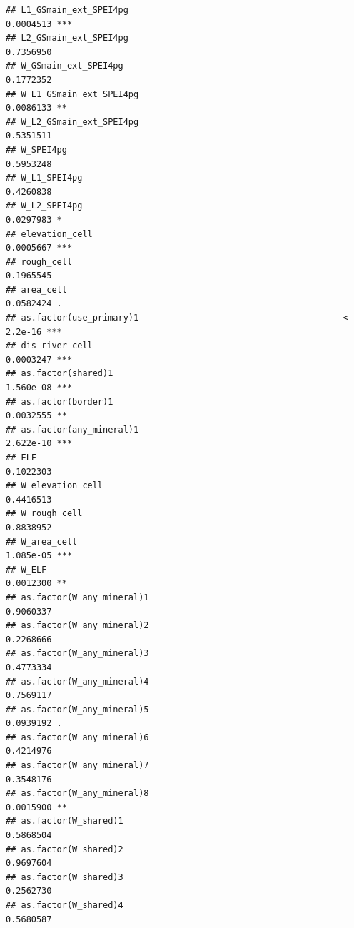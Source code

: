 \documentclass[
  a4paper,
]{article}
\begin{document}
\begin{verbatim}
## L1_GSmain_ext_SPEI4pg                                          0.0004513 ***
## L2_GSmain_ext_SPEI4pg                                          0.7356950    
## W_GSmain_ext_SPEI4pg                                           0.1772352    
## W_L1_GSmain_ext_SPEI4pg                                        0.0086133 ** 
## W_L2_GSmain_ext_SPEI4pg                                        0.5351511    
## W_SPEI4pg                                                      0.5953248    
## W_L1_SPEI4pg                                                   0.4260838    
## W_L2_SPEI4pg                                                   0.0297983 *  
## elevation_cell                                                 0.0005667 ***
## rough_cell                                                     0.1965545    
## area_cell                                                      0.0582424 .  
## as.factor(use_primary)1                                        < 2.2e-16 ***
## dis_river_cell                                                 0.0003247 ***
## as.factor(shared)1                                             1.560e-08 ***
## as.factor(border)1                                             0.0032555 ** 
## as.factor(any_mineral)1                                        2.622e-10 ***
## ELF                                                            0.1022303    
## W_elevation_cell                                               0.4416513    
## W_rough_cell                                                   0.8838952    
## W_area_cell                                                    1.085e-05 ***
## W_ELF                                                          0.0012300 ** 
## as.factor(W_any_mineral)1                                      0.9060337    
## as.factor(W_any_mineral)2                                      0.2268666    
## as.factor(W_any_mineral)3                                      0.4773334    
## as.factor(W_any_mineral)4                                      0.7569117    
## as.factor(W_any_mineral)5                                      0.0939192 .  
## as.factor(W_any_mineral)6                                      0.4214976    
## as.factor(W_any_mineral)7                                      0.3548176    
## as.factor(W_any_mineral)8                                      0.0015900 ** 
## as.factor(W_shared)1                                           0.5868504    
## as.factor(W_shared)2                                           0.9697604    
## as.factor(W_shared)3                                           0.2562730    
## as.factor(W_shared)4                                           0.5680587    

\end{verbatim}
\end{document}
